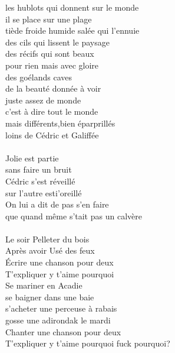 les hublots qui donnent sur le monde\\
il se place sur une plage\\
tiède froide humide salée qui l'ennuie\\
des cils qui lissent le paysage\\
des récifs qui sont beaux\\
pour rien mais avec gloire\\
des goélands caves\\
de la beauté donnée à voir\\
juste assez de monde\\
c'est à dire tout le monde\\
mais différents,bien éparprillés\\
loins de Cédric et Galiffée\\
\\
Jolie est partie \\
sans faire un bruit\\
Cédric s'est réveillé\\
sur l'autre esti'oreillé\\
On lui a dit de pas s'en faire\\
que quand même s'tait pas un calvère\\
\\
Le soir Pelleter du bois\\
Après avoir Usé des feux\\
Écrire une chanson pour deux\\
T'expliquer y t'aime pourquoi\\
Se mariner en Acadie \\
se baigner dans une baie\\
s'acheter une perceuse à rabais\\
gosse une adirondak le mardi\\
Chanter une chanson pour deux\\
T'expliquer y t'aime pourquoi \hfill fuck pourquoi?
